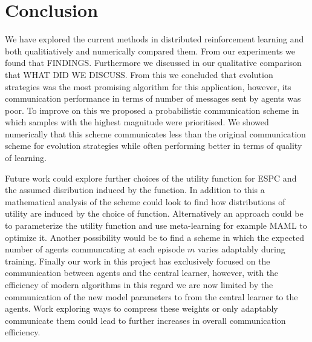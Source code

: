 \section{Conclusion}

We have explored the current methods in distributed reinforcement learning and both qualitiatively and numerically compared them. From our experiments we found that FINDINGS. Furthermore we discussed in our qualitative comparison that WHAT DID WE DISCUSS. From this we concluded that evolution strategies was the most promising algorithm for this application, however, its communication performance in terms of number of messages sent by agents was poor. To improve on this we proposed a probabilistic communication scheme in which samples with the highest magnitude were prioritised. We showed numerically that this scheme communicates less than the original communication scheme for evolution strategies while often performing better in terms of quality of learning.

Future work could explore further choices of the utility function for ESPC and the assumed disribution induced by the function. In addition to this a mathematical analysis of the scheme could look to find how distributions of utility are induced by the choice of function. Alternatively an approach could be to parameterize the utility function and use meta-learning for example MAML \cite{MAML} to optimize it. Another possibility would be to find a scheme in which the expected number of agents communcating at each episode $m$ varies adaptably during training. Finally our work in this project has exclusively focused on the communication between agents and the central learner, however, with the efficiency of modern algorithms in this regard we are now limited by the communication of the new model parameters to from the central learner to the agents. Work exploring ways to compress these weights or only adaptably communicate them could lead to further increases in overall communication efficiency.